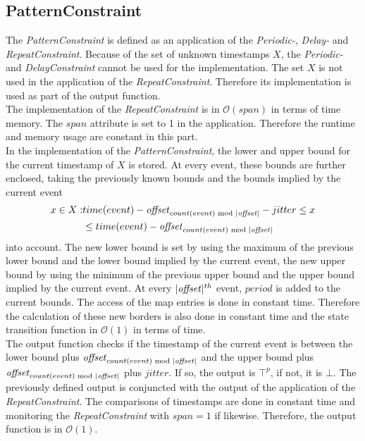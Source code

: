 \subsection{PatternConstraint}
	The \emph{PatternConstraint} is defined as an application of the \emph{Periodic-}, \emph{Delay-} and \emph{RepeatConstraint}. Because of the set of unknown timestamps $X$, the \emph{Periodic-} and \emph{DelayConstraint} cannot be used for the implementation. The set $X$ is not used in the application of the \emph{RepeatConstraint}. Therefore its implementation is used as part of the output function.\\
	The implementation of the \emph{RepeatConstraint} is in $\mathcal{O}(span)$ in terms of time memory. The $span$ attribute is set to 1 in the application. Therefore the runtime and memory usage are constant in this part.\\
	In the implementation of the \emph{PatternConstraint}, the lower and upper bound for the current timestamp of $X$ is stored. At every event, these bounds are further enclosed, taking the previously known bounds and the bounds implied by the current event
	\begin{align}
		x\in X: &time(event)-\text{\emph{offset}}_{count(event)\text{ mod }|\text{\emph{offset}}|}-jitter \leq x\\
			     &\leq  time(event)-\text{\emph{offset}}_{count(event)\text{ mod }|\text{\emph{offset}}|}
	\end{align}
	into account. The new lower bound is set by using the maximum of the previous lower bound and the lower bound implied by the current event, the new upper bound by using the minimum of the previous upper bound and the upper bound implied by the current event. At every $|\text{\emph{offset}}|^{th}$ event, $period$ is added to the current bounds. The access of the map entries is done in constant time. Therefore the calculation of these new borders is also done in constant time and the state transition function in $\mathcal{O}(1)$ in terms of time.\\
	The output function checks if the timestamp of the current event is between the lower bound plus $\text{\emph{offset}}_{count(event)\text{ mod }|\text{\emph{offset}}|}$ and the upper bound plus \\$\text{\emph{offset}}_{count(event)\text{ mod }|\text{\emph{offset}}|}$ plus $jitter$. If so, the output is $\top^p$, if not, it is $\bot$. The previously defined output is conjuncted with the output of the application of the \textit{RepeatConstraint}. The comparisons of timestamps are done in constant time and monitoring the \textit{RepeatConstraint} with $span=1$ if likewise. Therefore, the output function is in $\mathcal{O}(1)$.\\
